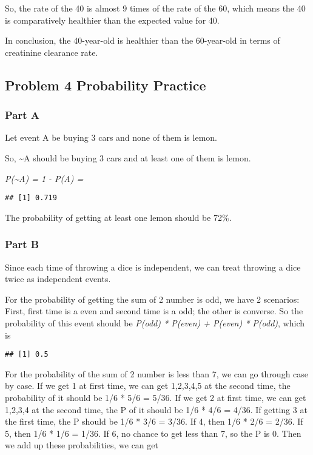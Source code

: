 \documentclass[
]{article}
\begin{document}
So, the rate of the 40 is almost 9 times of the rate of the 60, which means the 40 is comparatively healthier than the expected value for 40.

In conclusion, the 40-year-old is healthier than the 60-year-old in terms of creatinine clearance rate.

\hypertarget{problem-4-probability-practice}{%
\subsection{Problem 4 Probability Practice}\label{problem-4-probability-practice}}

\hypertarget{part-a-5}{%
\subsubsection{Part A}\label{part-a-5}}

Let event A be buying 3 cars and none of them is lemon.

So, \textasciitilde A should be buying 3 cars and at least one of them is lemon.

\emph{P(\textasciitilde A) = 1 - P(A) =}

\begin{verbatim}
## [1] 0.719
\end{verbatim}

The probability of getting at least one lemon should be 72\%.

\hypertarget{part-b-5}{%
\subsubsection{Part B}\label{part-b-5}}

Since each time of throwing a dice is independent, we can treat throwing a dice twice as independent events.

For the probability of getting the sum of 2 number is odd, we have 2 scenarios: First, first time is a even and second time is a odd; the other is converse. So the probability of this event should be \emph{P(odd) * P(even) + P(even) * P(odd)}, which is

\begin{verbatim}
## [1] 0.5
\end{verbatim}

For the probability of the sum of 2 number is less than 7, we can go through case by case. If we get 1 at first time, we can get 1,2,3,4,5 at the second time, the probability of it should be 1/6 * 5/6 = 5/36. If we get 2 at first time, we can get 1,2,3,4 at the second time, the P of it should be 1/6 * 4/6 = 4/36. If getting 3 at the first time, the P should be 1/6 * 3/6 = 3/36. If 4, then 1/6 * 2/6 = 2/36. If 5, then 1/6 * 1/6 = 1/36. If 6, no chance to get less than 7, so the P is 0. Then we add up these probabilities, we can get
\end{document}
